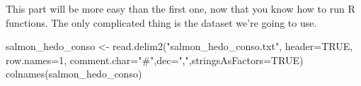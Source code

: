 \documentclass[
]{book}
\newenvironment{Shaded}{\begin{snugshade}}{\end{snugshade}}
\newcommand{\AttributeTok}[1]{\textcolor[rgb]{0.77,0.63,0.00}{#1}}
\newcommand{\ConstantTok}[1]{\textcolor[rgb]{0.00,0.00,0.00}{#1}}
\newcommand{\DecValTok}[1]{\textcolor[rgb]{0.00,0.00,0.81}{#1}}
\newcommand{\FunctionTok}[1]{\textcolor[rgb]{0.00,0.00,0.00}{#1}}
\newcommand{\NormalTok}[1]{#1}
\newcommand{\OtherTok}[1]{\textcolor[rgb]{0.56,0.35,0.01}{#1}}
\newcommand{\StringTok}[1]{\textcolor[rgb]{0.31,0.60,0.02}{#1}}
\begin{document}
This part will be more easy than the first one, now that you know how to run R functions. The only complicated thing is the dataset we're going to use.

\begin{Shaded}
\begin{Highlighting}[]
\NormalTok{salmon\_hedo\_conso }\OtherTok{\textless{}{-}} \FunctionTok{read.delim2}\NormalTok{(}\StringTok{"salmon\_hedo\_conso.txt"}\NormalTok{, }\AttributeTok{header=}\ConstantTok{TRUE}\NormalTok{, }\AttributeTok{row.names=}\DecValTok{1}\NormalTok{, }\AttributeTok{comment.char=}\StringTok{"\#"}\NormalTok{,}\AttributeTok{dec=}\StringTok{","}\NormalTok{,}\AttributeTok{stringsAsFactors=}\ConstantTok{TRUE}\NormalTok{)}
\FunctionTok{colnames}\NormalTok{(salmon\_hedo\_conso)}
\end{Highlighting}
\end{Shaded}
\end{document}
